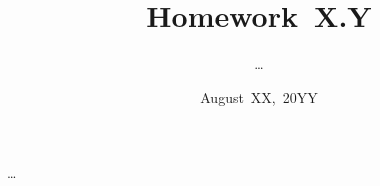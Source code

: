 \documentclass{article}
\begin{document}
\title{Homework~X.Y}
\author{\dots}
\date{August~XX,~20YY}

\dots %
\end{document}
